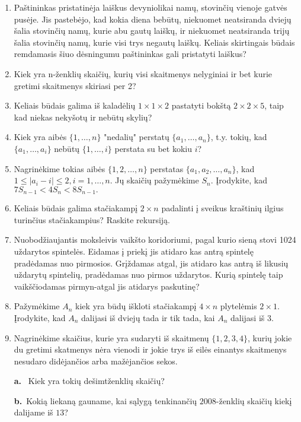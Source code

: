 \begin{enumerate}
\item Paštininkas pristatinėja laiškus devyniolikai namų, stovinčių vienoje gatvės pusėje. Jis pastebėjo, kad kokia diena bebūtų, niekuomet neatsiranda dviejų šalia stovinčių namų, kurie abu gautų laiškų, ir niekuomet neatsiranda trijų šalia stovinčių namų, kurie visi trys negautų laiškų. Keliais skirtingais būdais remdamasis šiuo dėsningumu paštininkas gali pristatyti laiškus?  

\item Kiek yra n-ženklių skaičių, kurių visi skaitmenys nelyginiai ir bet kurie gretimi skaitmenys skiriasi per 2? 

\item Keliais būdais galima iš kaladėlių $1\times 1\times 2$ pastatyti bokštą $2 \times 2 \times 5$, taip kad niekas nekyšotų ir nebūtų skylių?

\item Kiek yra aibės $\{1,\dots, n\}$ "nedalių" perstatų $\{a_1,\dots, a_n\}$, t.y. tokių, kad $\{a_1,\dots, a_i\}$ nebūtų $\{1,\dots,i\}$ perstata su bet kokiu $i$? 

\item Nagrinėkime tokias aibės $\{1,2,\dots,n\}$ perstatas $\{a_1, a_2,\dots,a_n\}$, kad $1 \leq |a_i - i| \leq 2, i=1,\dots,n$. Jų skaičių pažymėkime $S_n$. Įrodykite, kad $7S_{n-1}<4S_n<8S_{n-1}.$

\item Keliais būdais galima stačiakampį $2\times n$ padalinti į sveikus kraštinių ilgius turinčius stačiakampius? Raskite rekursiją. 

\item Nuobodžiaujantis moksleivis vaikšto koridoriumi, pagal kurio sieną stovi 1024 uždarytos spintelės. Eidamas į priekį jis atidaro kas antrą spintelę pradėdamas nuo pirmosios. Grįždamas atgal, jis atidaro kas antrą iš likusių uždarytų spintelių, pradėdamas nuo pirmos uždarytos. Kurią spintelę taip vaikščiodamas pirmyn-atgal jis atidarys paskutinę?

\item Pažymėkime $A_n$ kiek yra būdų iškloti stačiakampį $4 \times n$ plytelėmis $2 \times 1$. Įrodykite, kad $A_n$ dalijasi iš dviejų tada ir tik tada, kai $A_n$ dalijasi iš $3.$

\item Nagrinėkime skaičius, kurie yra sudaryti iš skaitmenų $\{1,2,3,4\}$, kurių jokie du gretimi skatmenys nėra vienodi ir jokie trys iš eilės einantys skaitmenys nesudaro didėjančios arba mažėjančios sekos. 

{\bf a.} \ Kiek yra tokių dešimtženklių skaičių?

{\bf b.} \,Kokią liekaną gauname, kai sąlygą tenkinančių $2008$-ženklių skaičių kiekį dalijame iš $13$?

\end{enumerate}

